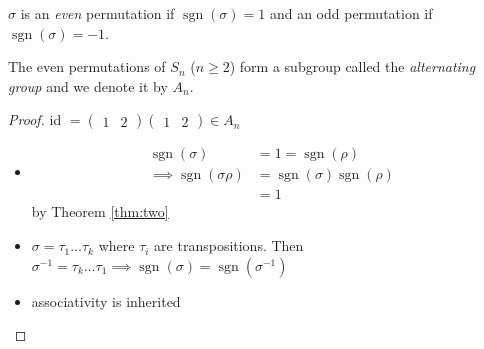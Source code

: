 \begin{definition}
\protect\hypertarget{def:eleven}{}\label{def:eleven}\(\sigma\) is an \emph{even} permutation if \(\operatorname{sgn}(\sigma) = 1\) and an odd permutation if \(\operatorname{sgn}(\sigma) = -1\).
\end{definition}

\begin{corollary}
The even permutations of \(S_n\) (\(n \geq 2\)) form a subgroup called the \emph{alternating group} and we denote it by \(A_n\).
\end{corollary}

\begin{proof}

id \(= \begin{pmatrix}1 & 2\end{pmatrix} \begin{pmatrix}1 & 2\end{pmatrix} \in A_n\)

\begin{itemize}
\item
  \begin{align*}
    \operatorname{sgn}(\sigma) &= 1 = \operatorname{sgn}(\rho) \\ 
    \implies \operatorname{sgn}(\sigma \rho) &= \operatorname{sgn}(\sigma) \operatorname{sgn}(\rho) \\
    &= 1
  \end{align*} by Theorem \ref{thm:two}
\item
  \(\sigma = \tau_1 \ldots \tau_k\) where \(\tau_i\) are transpositions.
  Then \(\sigma^{-1} = \tau_k \ldots \tau_1 \implies \operatorname{sgn}(\sigma) = \operatorname{sgn}(\sigma^{-1})\)
\item
  associativity is inherited
\end{itemize}

\end{proof}

